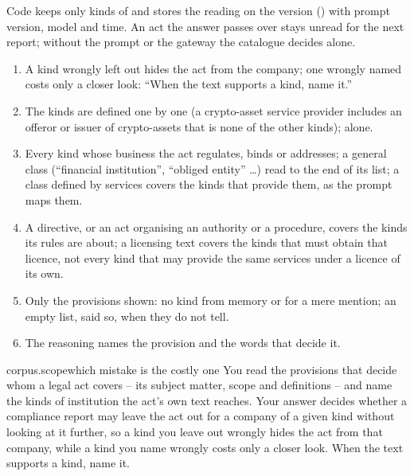 Code keeps only kinds of  and stores the reading on the version
() with prompt version, model and time. An act the answer
passes over stays unread for the next report; without the prompt or the gateway the
catalogue decides alone.

\begin{enumerate}[itemsep=1pt, topsep=3pt]
  \item A kind wrongly left out hides the act from the company; one wrongly named costs only a
    closer look: \enquote{When the text supports a kind, name it.}
  \item The kinds are defined one by one (a crypto-asset service provider includes an offeror
    or issuer of crypto-assets that is none of the other kinds);  alone.
  \item Every kind whose business the act regulates, binds or addresses; a general class
    (\enquote{financial institution}, \enquote{obliged entity} …) read to the end of its list;
    a class defined by services covers the kinds that provide them, as the prompt maps them.
  \item A directive, or an act organising an authority or a procedure, covers the kinds its
    rules are about; a licensing text covers the kinds that must obtain that licence, not every
    kind that may provide the same services under a licence of its own.
  \item Only the provisions shown: no kind from memory or for a mere mention; an empty list,
    said so, when they do not tell.
  \item The reasoning names the provision and the words that decide it.
\end{enumerate}

\par\nopagebreak
\begin{promptexcerpt}{corpus.scope}{which mistake is the costly one}
You read the provisions that decide whom a legal act covers – its subject matter, scope and definitions – and name the kinds of institution the act's own text reaches. Your answer decides whether a compliance report may leave the act out for a company of a given kind without looking at it further, so a kind you leave out wrongly hides the act from that company, while a kind you name wrongly costs only a closer look. When the text supports a kind, name it.
\end{promptexcerpt}

